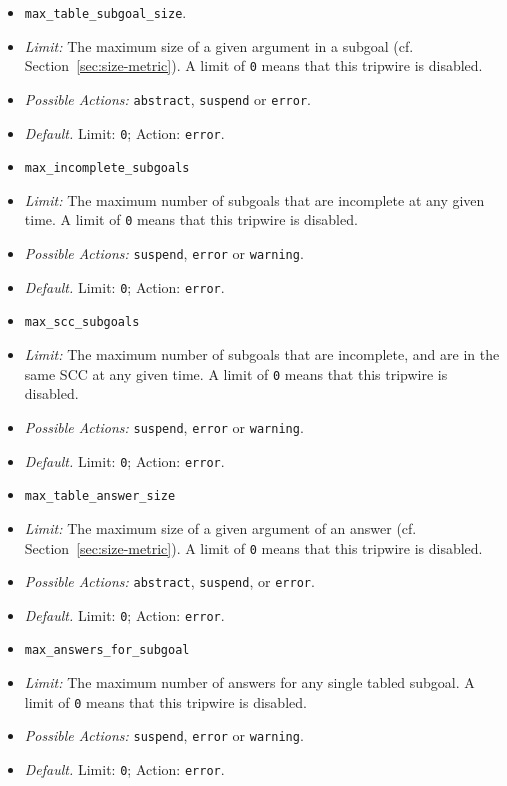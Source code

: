 \begin{itemize}

\item {\tt max\_table\_subgoal\_size}. 
\bi  
\item {\em Limit:} The maximum size of a given argument in a subgoal
 (cf. Section~\ref{sec:size-metric}).  A limit of {\tt 0} means that
 this tripwire is disabled.
\item{\em  Possible Actions:} {\tt abstract}, {\tt suspend} or {\tt error}.
\item {\em Default.} Limit: {\tt 0}; Action: {\tt error}.
\ei

\item {\tt max\_incomplete\_subgoals}
\bi  
\item {\em Limit:} The maximum number of subgoals that are
 incomplete at any given time.  A limit of {\tt 0} means that
 this tripwire is disabled.
\item{\em  Possible Actions:} {\tt suspend}, {\tt error} or {\tt warning}.
\item {\em Default.} Limit: {\tt 0}; Action: {\tt error}.
\ei

\item {\tt max\_scc\_subgoals}
\bi  
\item {\em Limit:} The maximum number of subgoals that are incomplete,
 and are in the same SCC at any given time.  A limit of {\tt 0} means
 that this tripwire is disabled.
\item{\em  Possible Actions:} {\tt suspend}, {\tt error} or {\tt warning}.
\item {\em Default.} Limit: {\tt 0}; Action: {\tt error}.
\ei

\item {\tt max\_table\_answer\_size}
\bi  
\item {\em Limit:} The maximum size of a given argument of an answer
 (cf. Section~\ref{sec:size-metric}).  A limit of {\tt 0} means that
 this tripwire is disabled.
\item{\em  Possible Actions:} {\tt abstract}, {\tt suspend}, or {\tt error}.
\item {\em Default.} Limit: {\tt 0}; Action: {\tt error}.
\ei

\item {\tt max\_answers\_for\_subgoal}
\bi  
\item {\em Limit:} The maximum number of answers for any single tabled
 subgoal.  A limit of {\tt 0} means that
 this tripwire is disabled.
\item{\em  Possible Actions:} {\tt suspend}, {\tt error} or {\tt warning}.
\item {\em Default.} Limit: {\tt 0}; Action: {\tt error}.
\ei


\end{itemize}
